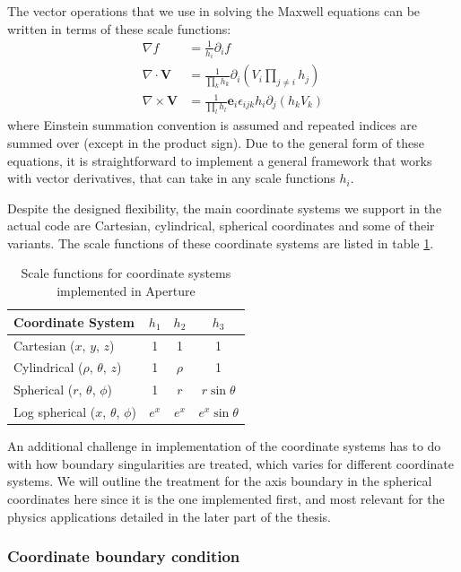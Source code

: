 The vector operations that we use in solving the Maxwell equations can be
written in terms of these scale functions:
\begin{align}
  \label{eq:vector-derivatives}
  \nabla f &= \frac{1}{h_{i}}\partial_{i}f \\
  \nabla \cdot \mathbf{V} &= \frac{1}{\prod_{k}h_{k}}\partial_i(V_i\prod_{j\neq i}h_{j}) \\
  \nabla \times \mathbf{V} &= \frac{1}{\prod_lh_l}\mathbf{e}_{i}\epsilon_{ijk}h_i\partial_j(h_kV_k)
\end{align}
where Einstein summation convention is assumed and repeated indices are summed
over (except in the product sign). Due to the general form of these equations,
it is straightforward to implement a general framework that works with vector
derivatives, that can take in any scale functions $h_{i}$.

Despite the designed flexibility, the main coordinate systems we support in the
actual code are Cartesian, cylindrical, spherical coordinates and some of their
variants. The scale functions of these coordinate systems are listed in table
\ref{tab:scale-functions}.

\begin{table}[h]
  \centering
  \begin{tabular}{lccc}
    \hline
    Coordinate System & $h_1$ & $h_2$ & $h_3$ \\ \hline
    Cartesian ($x$, $y$, $z$) & 1 & 1 & 1 \\ \hline
    Cylindrical ($\rho$, $\theta$, $z$) & 1 & $\rho$ & 1 \\ \hline
    Spherical ($r$, $\theta$, $\phi$) & 1 & $r$ & $r\sin\theta$ \\ \hline
    Log spherical ($x$, $\theta$, $\phi$) & $e^x$ & $e^{x}$ & $e^x\sin\theta$ \\ \hline
  \end{tabular}
  \caption{Scale functions for coordinate systems implemented in Aperture}
  \label{tab:scale-functions}
\end{table}

An additional challenge in implementation of the coordinate systems
has to do with how boundary singularities are treated, which varies for
different coordinate systems. We will outline the treatment for the axis
boundary in the spherical coordinates here since it is the one implemented
first, and most relevant for the physics applications detailed in the later part
of the thesis.

\subsubsection{Coordinate boundary condition}
\label{sec:coord-bc}

